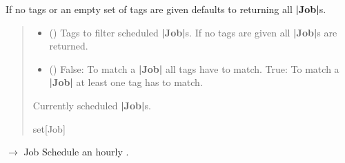 \documentclass[letterpaper,10pt,english]{sphinxmanual}
\begin{document}
\begin{fulllineitems}
\begin{fulllineitems}
\sphinxAtStartPar
If no tags or an empty set of tags are given defaults to returning
all {\color{red}\bfseries{}|Job|}s.
\begin{quote}\begin{description}
\begin{itemize}
\item {} 
\sphinxAtStartPar
{} (\sphinxstyleliteralemphasis{\sphinxupquote{{[}}}\sphinxstyleliteralemphasis{\sphinxupquote{{]}}}) \textendash{} Tags to filter scheduled {\color{red}\bfseries{}|Job|}s.
If no tags are given all {\color{red}\bfseries{}|Job|}s are returned.

\item {} 
\sphinxAtStartPar
{} () \textendash{} False: To match a {\color{red}\bfseries{}|Job|} all tags have to match.
True: To match a {\color{red}\bfseries{}|Job|} at least one tag has to match.

\end{itemize}

\sphinxAtStartPar
Currently scheduled {\color{red}\bfseries{}|Job|}s.

\sphinxAtStartPar
set{[}Job{]}

\end{description}\end{quote}

\end{fulllineitems}


\begin{fulllineitems}
\label{\detokenize{index:scheduler.Scheduler.hourly}}
\pysigstartsignatures
\pysiglinewithargsret
{}
{\sphinxparamcomma {}\sphinxparamcomma {}}
{{ $\rightarrow$ Job}}
\pysigstopsignatures
\sphinxAtStartPar
Schedule an hourly .


\end{fulllineitems}
\end{fulllineitems}
\end{document}
